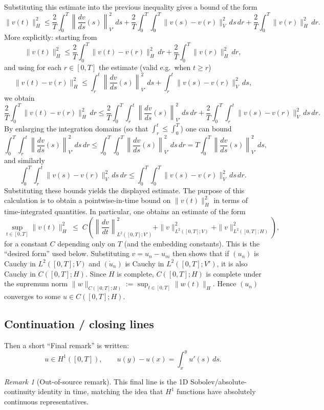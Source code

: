 \documentclass[11pt]{article}
\theoremstyle{definition}
\theoremstyle{remark}
\newtheorem{remark}{Remark}
\begin{document}
Substituting this estimate into the previous inequality gives a bound of the form
\[
\|v(t)\|_H^2
\le
\frac{2}{T}\int_0^T\left\|\frac{dv}{ds}(s)\right\|_{V'}^2\,ds
+
\frac{2}{T}\int_0^T\!\!\int_0^T \|v(s)-v(r)\|_V^2\,ds\,dr
+
\frac{2}{T}\int_0^T \|v(r)\|_H^2\,dr.
\]
\noindent
More explicitly: starting from
\[
\|v(t)\|_H^2
\le
\frac{2}{T}\int_0^T \|v(t)-v(r)\|_H^2\,dr
+
\frac{2}{T}\int_0^T \|v(r)\|_H^2\,dr,
\]
and using for each $r\in[0,T]$ the estimate (valid e.g.\ when $t\ge r$)
\[
\|v(t)-v(r)\|_H^2
\le
\int_r^t \left\|\frac{dv}{ds}(s)\right\|_{V'}^2\,ds
+
\int_r^t \|v(s)-v(r)\|_V^2\,ds,
\]
we obtain
\[
\frac{2}{T}\int_0^T \|v(t)-v(r)\|_H^2\,dr
\le
\frac{2}{T}\int_0^T\int_r^t \left\|\frac{dv}{ds}(s)\right\|_{V'}^2\,ds\,dr
+
\frac{2}{T}\int_0^T\int_r^t \|v(s)-v(r)\|_V^2\,ds\,dr.
\]
By enlarging the integration domains (so that $\int_r^t \le \int_0^T$) one can bound
\[
\int_0^T\int_r^t \left\|\frac{dv}{ds}(s)\right\|_{V'}^2\,ds\,dr
\le
\int_0^T\int_0^T \left\|\frac{dv}{ds}(s)\right\|_{V'}^2\,ds\,dr
=
T\int_0^T \left\|\frac{dv}{ds}(s)\right\|_{V'}^2\,ds,
\]
and similarly
\[
\int_0^T\int_r^t \|v(s)-v(r)\|_V^2\,ds\,dr
\le
\int_0^T\int_0^T \|v(s)-v(r)\|_V^2\,ds\,dr.
\]
Substituting these bounds yields the displayed estimate.
\noindent
The purpose of this calculation is to obtain a pointwise-in-time bound on $\|v(t)\|_H^2$ in terms of time-integrated quantities. In particular, one obtains an estimate of the form
\[
\sup_{t\in[0,T]}\|v(t)\|_H^2
\;\le\;
C\left(
\left\|\frac{dv}{dt}\right\|_{L^2([0,T];V')}^2
+
\|v\|_{L^2([0,T];V)}^2
+
\|v\|_{L^2([0,T];H)}^2
\right),
\]
for a constant $C$ depending only on $T$ (and the embedding constants). This is the ``desired form'' used below.
Substituting $v=u_n-u_m$ then shows that if $(u_n)$ is Cauchy in $L^2([0,T];V)$ and $(\dot u_n)$ is Cauchy in $L^2([0,T];V')$, it is also Cauchy in $C([0,T];H)$.
\noindent
Since $H$ is complete, $C([0,T];H)$ is complete under the supremum norm $\|w\|_{C([0,T];H)}:=\sup_{t\in[0,T]}\|w(t)\|_H$. Hence $(u_n)$ converges to some $u\in C([0,T];H)$.
\subsection*{Continuation / closing lines}

Then a short ``Final remark'' is written:
\[
u\in H^1([0,T]),
\qquad
u(y)-u(x)=\int_x^y u'(s)\,ds.
\]

\begin{remark}[Out-of-source remark]
This final line is the 1D Sobolev/absolute-continuity identity in time, matching the idea that $H^1$ functions have absolutely continuous representatives.
\end{remark}
\end{document}
